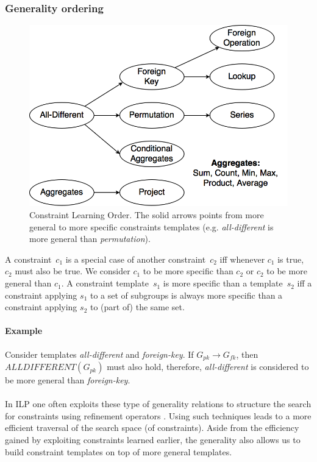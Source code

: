 \documentclass{ecai}
\newcommand{\ecfkey}[2]{\ensuremath{#1 \rightarrow #2}}
\newcommand{\ecalldiff}[1]{\ensuremath{\mathit{ALLDIFFERENT}(#1)}}
\begin{document}
\subsubsection{Generality ordering}

\begin{figure}[tbh]
  \centering
  \includegraphics[width=0.9\linewidth]{figures/constraint_dependency.png}
  \caption{Constraint Learning Order. The solid arrows points from more general to more specific constraints templates (e.g. \textit{all-different} is more general than \textit{permutation}).}
  \label{fig:learning_order}
\end{figure}

A constraint~$c_1$ is a special case of another constraint~$c_2$ iff whenever $c_1$ is true, $c_2$ must also be true.
We consider $c_1$ to be more specific than $c_2$ or $c_2$ to be more general than $c_1$.
A constraint template~$s_1$ is more specific than a template~$s_2$ iff a constraint applying $s_1$ to a set of subgroups is always more specific than a constraint applying $s_2$ to (part of) the same set.

\paragraph{Example}
Consider templates \textit{all-different} and \textit{foreign-key}.
If \ecfkey{G_{pk}}{G_{fk}}, then \ecalldiff{G_{pk}} must also hold, therefore, \textit{all-different} is considered to be more general than \textit{foreign-key}.
\\\\
In ILP one often exploits these type of generality relations to structure the search for constraints using refinement operators \cite{luc_book}.
Using such techniques leads to a more efficient traversal of the search space (of constraints).
Aside from the efficiency gained by exploiting constraints learned earlier, the generality also allows us to build constraint templates on top of more general templates.
\end{document}
